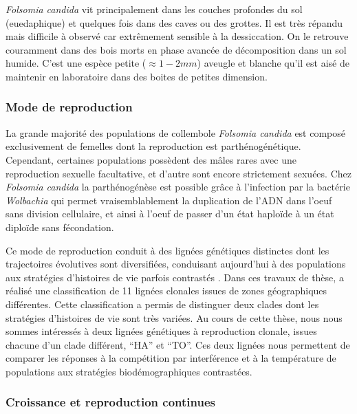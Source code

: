 \textit{Folsomia candida} vit principalement dans les couches profondes du sol
(euedaphique) et quelques fois dans des caves ou des grottes. Il est très
répandu mais difficile à observé car extrêmement sensible à la dessiccation. On
le retrouve couramment dans des bois morts en phase avancée de décomposition
dans un sol humide. C'est une espèce petite ($\approx 1 - 2 mm$) aveugle et
blanche qu'il est aisé de maintenir en laboratoire dans des boites de petites
dimension. 

\subsubsection{Mode de reproduction}

La grande majorité des populations de collembole \textit{Folsomia candida} est
composé exclusivement de femelles dont la reproduction est parthénogénétique.
Cependant, certaines populations possèdent des mâles rares avec une reproduction
sexuelle facultative, et d'autre sont encore strictement sexuées. Chez
\textit{Folsomia candida} la parthénogénèse est possible grâce à l'infection par
la bactérie \textit{Wolbachia} qui permet vraisemblablement la duplication de
l'ADN dans l'oeuf sans division cellulaire, et ainsi à l'oeuf de passer d'un
état haploïde à un état diploïde sans fécondation. 

Ce mode de reproduction conduit à des lignées génétiques distinctes dont les
trajectoires évolutives sont diversifiées, conduisant aujourd'hui à des
populations aux stratégies d'histoires de vie parfois contrastés
\autocites{tully2004a,tully2008a}. Dans ces travaux de thèse,
\textcites{tully2004a} a réalisé une classification de 11 lignées clonales
issues de zones géographiques différentes. Cette classification a permis de
distinguer deux clades dont les stratégies d'histoires de vie sont très variées.
Au cours de cette thèse, nous nous sommes intéressés à deux lignées génétiques à
reproduction clonale, issues chacune d'un clade différent, ``HA'' et ``TO''. Ces
deux lignées nous permettent de comparer les réponses à la compétition par interférence et à la
température de populations aux stratégies biodémographiques contrastées.

\subsubsection{Croissance et reproduction continues}

